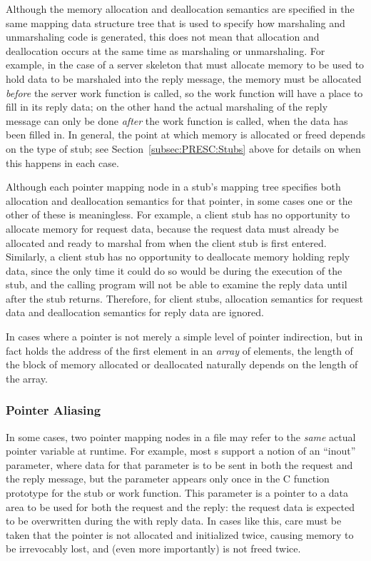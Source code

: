 Although the memory allocation and deallocation semantics are specified in the
same mapping data structure tree that is used to specify how marshaling and
unmarshaling code is generated, this does not mean that allocation and
deallocation occurs at the same time as marshaling or unmarshaling.  For
example, in the case of a server skeleton that must allocate memory to be used
to hold data to be marshaled into the reply message, the memory must be
allocated \emph{before} the server work function is called, so the work
function will have a place to fill in its reply data; on the other hand the
actual marshaling of the reply message can only be done \emph{after} the work
function is called, when the data has been filled in.  In general, the point at
which memory is allocated or freed depends on the type of stub; see
Section~\ref{subsec:PRESC:Stubs} above for details on when this happens in each case.

Although each pointer mapping node in a stub's mapping tree specifies both
allocation and deallocation semantics for that pointer, in some cases one or
the other of these is meaningless.  For example, a client stub has no
opportunity to allocate memory for request data, because the request data must
already be allocated and ready to marshal from when the client stub is first
entered.  Similarly, a client stub has no opportunity to deallocate memory
holding reply data, since the only time it could do so would be during the
execution of the stub, and the calling program will not be able to examine the
reply data until after the stub returns.  Therefore, for client stubs,
allocation semantics for request data and deallocation semantics for reply data
are ignored.

In cases where a pointer is not merely a simple level of pointer indirection,
but in fact holds the address of the first element in an \emph{array} of
elements, the length of the block of memory allocated or deallocated naturally
depends on the length of the array.

\subsubsection{Pointer Aliasing}

In some cases, two pointer mapping nodes in a \PRESC{} file may refer to the
\emph{same} actual pointer variable at runtime.  For example, most \IDL{}s
support a notion of an ``inout'' parameter, where data for that parameter is to
be sent in both the request and the reply message, but the parameter appears
only once in the C function prototype for the stub or work function.  This
parameter is a pointer to a data area to be used for both the request and the
reply: the request data is expected to be overwritten during the \RPC{} with
reply data.  In cases like this, care must be taken that the pointer is not
allocated and initialized twice, causing memory to be irrevocably lost, and
(even more importantly) is not freed twice.

